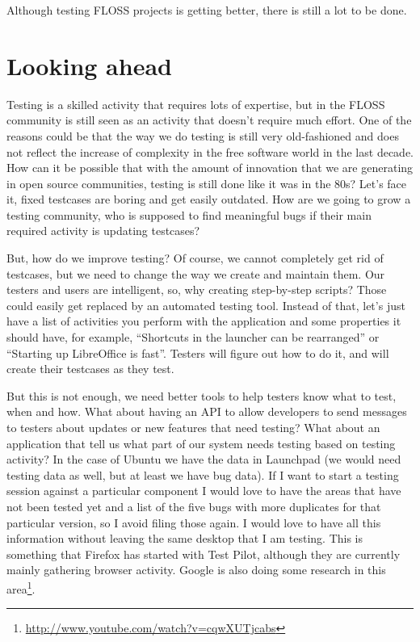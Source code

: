 Although testing FLOSS projects is getting better, there is still a lot to be
done.

\section*{Looking ahead}

Testing is a skilled activity that requires lots of expertise, but in the FLOSS
community is still seen as an activity that doesn't require much effort. One of
the reasons could be that the way we do testing is still very old-fashioned and
does not reflect the increase of complexity in the free software world in the
last decade. How can it be possible that with the amount of innovation that we
are generating in open source communities, testing is still done like it was in
the 80s? Let's face it, fixed testcases are boring and get easily outdated. How
are we going to grow a testing community, who is supposed to find meaningful
bugs if their main required activity is updating testcases?

But, how do we improve testing? Of course, we cannot completely get rid of
testcases, but we need to change the way we create and maintain them. Our
testers and users are intelligent, so, why creating step-by-step scripts? Those
could easily get replaced by an automated testing tool. Instead of that, let's
just have a list of activities you perform with the application and some
properties it should have, for example, ``Shortcuts in the launcher can be
rearranged'' or ``Starting up LibreOffice is fast''. Testers will figure out how
to do it, and will create their testcases as they test.

But this is not enough, we need better tools to help testers know what to test,
when and how.  What about having an API to allow developers to send messages to
testers about updates or new features that need testing? What about an
application that tell us what part of our system needs testing based on testing
activity? In the case of Ubuntu we have the data in Launchpad (we would need
testing data as well, but at least we have bug data). If I want to start a
testing session against a particular component I would love to have the areas
that have not been tested yet and a list of the five bugs with more duplicates
for that particular version, so I avoid filing those again. I would love to have
all this information without leaving the same desktop that I am testing. This is
something that Firefox has started with Test Pilot, although they are currently
mainly gathering browser activity. Google is also doing some research in this
area\footnote{\url{http://www.youtube.com/watch?v=cqwXUTjcabs}}.

